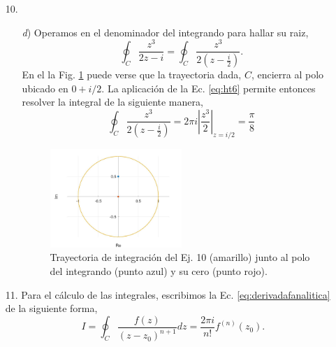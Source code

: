 \documentclass[10pt,a4paper]{article}
\begin{document}
\begin{enumerate}
\begin{enumerate}
	\label{ej:sol9b}	
\end{enumerate}

\item [10.]
\label{ej:sol10}
\begin{enumerate}
	\item[\textit{d})] Operamos en el denominador del integrando para hallar su raiz,
	\begin{equation}
	\oint_{C}\frac{z^3}{2z-i}=\oint_{C}\frac{z^3}{2(z-\frac{i}{2})}.
	\end{equation}
    En el la Fig. \ref{fig:sol10} puede verse que la trayectoria dada, $C$, 
    encierra al polo ubicado en $0+i/2$. La aplicaci\'on de la Ec. 
    \ref{eq:ht6} permite entonces resolver la integral de la siguiente manera,
	\begin{equation}
	\oint_{C}\frac{z^3}{2(z-\frac{i}{2})}=2\pi i 
	\left|\frac{z^3}{2}\right|_{z=i/2}=\boxed{\frac{\pi}{8}}
	\end{equation}
	\begin{figure}[!htbp]
		\centering
		\includegraphics[width=0.5\textwidth]{10.jpg}
		\caption{Trayectoria de integraci\'on del Ej. 10 (amarillo) 
		junto al polo del integrando (punto azul)  y su cero (punto rojo).}
		\label{fig:sol10}
	\end{figure}	
\end{enumerate}

\item [11.]
Para el c\'alculo de las integrales, escribimos la Ec. \ref{eq:derivadafanalitica} 
de la siguiente forma,
\begin{equation}\label{eq:integralderivada}
I=\oint_C\dfrac{f(z)}{(z-z_0)^{n+1}}dz=\dfrac{2\pi i}{n!}f^{(n)}(z_0).
\end{equation}


\end{enumerate}
\end{document}
